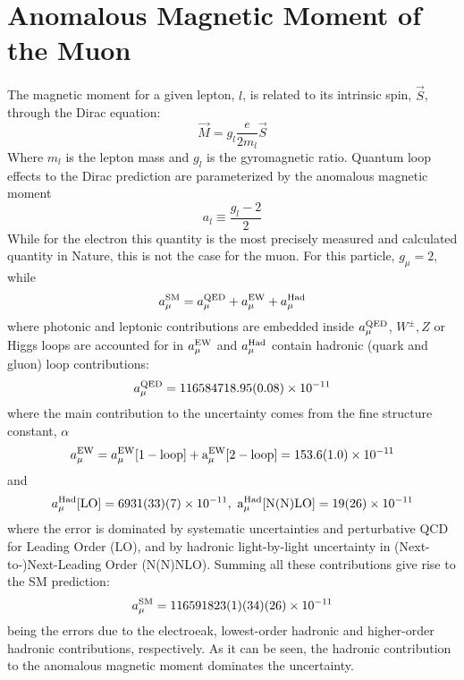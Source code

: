 \section{Anomalous Magnetic Moment of the Muon}
The magnetic moment for a given lepton, $l$, is related to its intrinsic spin, $\vec{S}$, through the Dirac equation:
\begin{equation}
\vec{M} = g_l \frac{e}{2m_l}\vec{S}
\end{equation}
Where $m_l$ is the lepton mass and $g_l$ is the gyromagnetic ratio. Quantum loop effects to the Dirac prediction are parameterized by the anomalous magnetic moment
\begin{equation}
a_l \equiv \frac{g_{l}-2}{2}
\end{equation}
While for the electron this quantity is the most precisely measured  and calculated  quantity in Nature, this is not the case for the muon. For this particle, $g_{\mu} = 2$, while
\begin{equation}
a_{\mu}^{\rm SM} = a_{\mu}^{\rm QED} + a_{\mu}^{\rm EW} + a_{\mu}^{\rm Had}
\end{equation}
where photonic and leptonic contributions are embedded inside $a_{\mu}^{\rm QED}$, $W^{\pm}, Z$ or Higgs loops are accounted for in $a_{\mu}^{\rm EW}$ and $a_{\mu}^{\rm Had}$ contain hadronic (quark and gluon) loop contributions:
\begin{equation}
a_{\mu}^{\rm QED} = 116584718.95(0.08)\times 10^{-11}
\end{equation}
where the main contribution to the uncertainty comes from the fine structure constant, $\alpha$ 
\begin{equation}
a_{\mu}^{\rm EW} = a_{\mu}^{\rm EW}[\rm 1-loop] + a_{\mu}^{\rm EW}[\rm 2-loop] = 153.6(1.0)\times 10^{-11} 
\end{equation}
and
\begin{equation}
a_{\mu}^{\rm Had}[\rm LO] = 6931(33)(7)\times 10^{-11},\ a_{\mu}^{\rm Had}[\rm N(N) LO] = 19(26)\times 10^{-11}
\end{equation}
where the error is dominated by systematic uncertainties and perturbative QCD for Leading Order (LO), and by hadronic light-by-light uncertainty in (Next-to-)Next-Leading Order (N(N)NLO). 
Summing all these contributions give rise to the SM prediction:
\begin{equation}
a_{\mu}^{\rm SM} = 116591823(1)(34)(26)\times 10^{-11}
\end{equation}
being the errors due to the electroeak, lowest-order hadronic and higher-order hadronic contributions, respectively. As it can be seen, the hadronic contribution to the anomalous magnetic moment dominates the uncertainty. 
